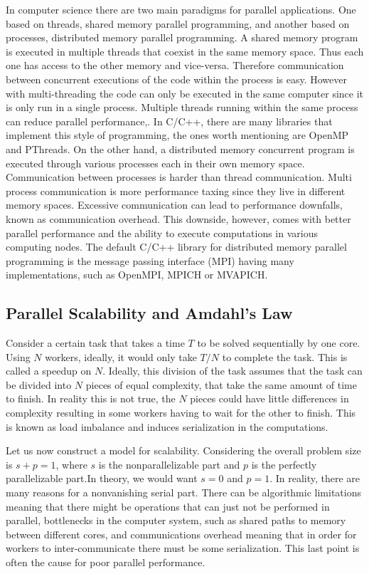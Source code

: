 		In computer science there are two main paradigms for parallel applications. One based on threads, shared memory parallel programming, and another based on processes, distributed memory parallel programming. 
A shared memory program is executed in multiple threads that coexist in the same memory space. Thus each one has access to the other memory and vice-versa. Therefore communication between concurrent executions of the code within the process is easy. However with multi-threading the code can only be executed in the same computer since it is only run in a single process. Multiple threads running within the same process can reduce parallel performance,. In C/C++, there are many libraries that implement this style of programming, the ones worth mentioning are OpenMP and PThreads. 
On the other hand, a distributed memory concurrent program is executed through various processes each in their own memory space. Communication between processes is harder than thread communication. Multi process communication is more performance taxing since they live in different memory spaces. Excessive communication can lead to performance downfalls, known as communication overhead. This downside, however, comes with better parallel performance and the ability to execute computations in various computing nodes. The default C/C++ library for distributed memory parallel programming is the message passing interface (MPI) having many implementations, such as OpenMPI, MPICH or MVAPICH.


\subsection{Parallel Scalability and Amdahl's Law}

	Consider a certain task that takes a time $T$ to be solved sequentially by one core. Using $N$ workers, ideally, it would only take $T / N$ to complete the task. This is called a speedup on $N$. Ideally, this division of the task assumes that the task can be divided into $N$ pieces of equal complexity, that take the same amount of time to finish. In reality this is not true, the $N$ pieces could have little differences in complexity resulting in some workers having to wait for the other to finish. This is known as load imbalance and induces serialization in the computations.
	
	Let us now construct a model for scalability. Considering the overall problem size is $s + p = 1$, where $s$ is the nonparallelizable part and $p$ is the perfectly parallelizable part.In theory, we would want $s=0$ and $p=1$. In reality, there are many reasons for a nonvanishing serial part. There can be algorithmic limitations meaning that there might be operations that can just not be performed in parallel, bottlenecks in the computer system, such as shared paths to memory between different cores, and communications overhead meaning that in order for workers to inter-communicate there must be some serialization. This last point is often the cause for poor parallel performance. 
		
